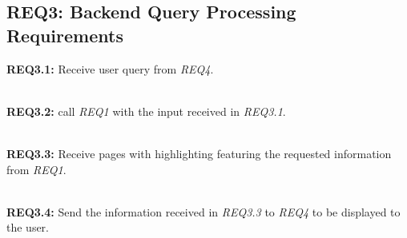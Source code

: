 \subsection{REQ3: Backend Query Processing Requirements}

\textbf{REQ3.1:} Receive user query from \textit{REQ4}.\par

\textbf{\\REQ3.2:} call \textit{REQ1} with the input received in \textit{REQ3.1}.\par

\textbf{\\REQ3.3:} Receive pages with highlighting featuring the requested information from \textit{REQ1}.\par

\textbf{\\REQ3.4:} Send the information received in \textit{REQ3.3} to \textit{REQ4} to be displayed to the user.\par

